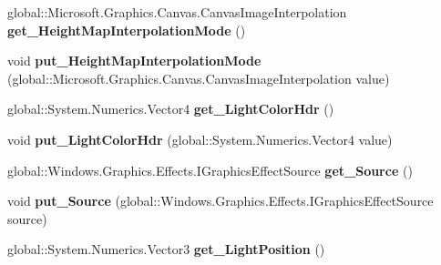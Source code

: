 \begin{DoxyCompactItemize}
global\+::\+Microsoft.\+Graphics.\+Canvas.\+Canvas\+Image\+Interpolation {\bfseries get\+\_\+\+Height\+Map\+Interpolation\+Mode} ()
\item 
\mbox{\label{interface_microsoft_1_1_graphics_1_1_canvas_1_1_effects_1_1_i_point_diffuse_effect_a71acc00729d13e8d20896bc50d91b8f2}} 
void {\bfseries put\+\_\+\+Height\+Map\+Interpolation\+Mode} (global\+::\+Microsoft.\+Graphics.\+Canvas.\+Canvas\+Image\+Interpolation value)
\item 
\mbox{\label{interface_microsoft_1_1_graphics_1_1_canvas_1_1_effects_1_1_i_point_diffuse_effect_af6323bc240399e8e21502921196ccc7c}} 
global\+::\+System.\+Numerics.\+Vector4 {\bfseries get\+\_\+\+Light\+Color\+Hdr} ()
\item 
\mbox{\label{interface_microsoft_1_1_graphics_1_1_canvas_1_1_effects_1_1_i_point_diffuse_effect_a9eba412095bf8b00a6c58f2544ebadec}} 
void {\bfseries put\+\_\+\+Light\+Color\+Hdr} (global\+::\+System.\+Numerics.\+Vector4 value)
\item 
\mbox{\label{interface_microsoft_1_1_graphics_1_1_canvas_1_1_effects_1_1_i_point_diffuse_effect_a8a447a6e348ce458ead4c24ca944c3ca}} 
global\+::\+Windows.\+Graphics.\+Effects.\+I\+Graphics\+Effect\+Source {\bfseries get\+\_\+\+Source} ()
\item 
\mbox{\label{interface_microsoft_1_1_graphics_1_1_canvas_1_1_effects_1_1_i_point_diffuse_effect_a113ecacb18418f02dae2ab189078545c}} 
void {\bfseries put\+\_\+\+Source} (global\+::\+Windows.\+Graphics.\+Effects.\+I\+Graphics\+Effect\+Source source)
\item 
\mbox{\label{interface_microsoft_1_1_graphics_1_1_canvas_1_1_effects_1_1_i_point_diffuse_effect_ab2fb8907a4c1ccf80adf4805eafce745}} 
global\+::\+System.\+Numerics.\+Vector3 {\bfseries get\+\_\+\+Light\+Position} ()

\end{DoxyCompactItemize}
